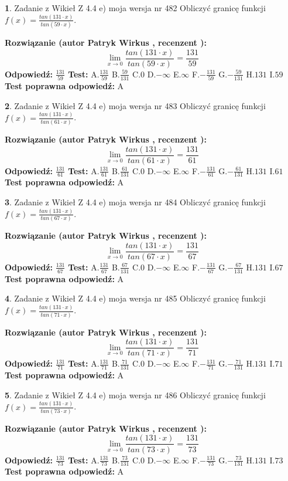 \documentclass[12pt, a4paper]{article}
\theoremstyle{definition} %
\newtheorem{zad}{}
\newcommand{\zadStart}[1]{\begin{zad}#1\newline}
\newcommand{\zadStop}{\end{zad}}
\newcommand{\rozwStart}[2]{\noindent \textbf{Rozwiązanie (autor #1 , recenzent #2): }\newline}
\newcommand{\rozwStop}{\newline}
\newcommand{\odpStart}{\noindent \textbf{Odpowiedź:}\newline}
\newcommand{\odpStop}{\newline}
\newcommand{\testStart}{\noindent \textbf{Test:}\newline}
\newcommand{\testStop}{\newline}
\newcommand{\kluczStart}{\noindent \textbf{Test poprawna odpowiedź:}\newline}
\newcommand{\kluczStop}{\newline}
\begin{document}
\zadStart{Zadanie z Wikieł Z 4.4 e) moja wersja nr 482}
Obliczyć granicę funkcji $f(x)=\frac{tan(131\cdot x)}{tan(59\cdot x)}$.
\zadStop
\rozwStart{Patryk Wirkus}{}
$$\lim\limits_{x\to 0}\frac{tan(131\cdot x)}{tan(59\cdot x)}=
\frac{131}{59}$$
\rozwStop
\odpStart
$\frac{131}{59}$
\odpStop
\testStart
A.$\frac{131}{59}$
B.$\frac{59}{131}$
C.$0$
D.$-\infty$
E.$\infty$
F.$-\frac{131}{59}$
G.$-\frac{59}{131}$
H.$131$
I.$59$
\testStop
\kluczStart
A
\kluczStop



\zadStart{Zadanie z Wikieł Z 4.4 e) moja wersja nr 483}
Obliczyć granicę funkcji $f(x)=\frac{tan(131\cdot x)}{tan(61\cdot x)}$.
\zadStop
\rozwStart{Patryk Wirkus}{}
$$\lim\limits_{x\to 0}\frac{tan(131\cdot x)}{tan(61\cdot x)}=
\frac{131}{61}$$
\rozwStop
\odpStart
$\frac{131}{61}$
\odpStop
\testStart
A.$\frac{131}{61}$
B.$\frac{61}{131}$
C.$0$
D.$-\infty$
E.$\infty$
F.$-\frac{131}{61}$
G.$-\frac{61}{131}$
H.$131$
I.$61$
\testStop
\kluczStart
A
\kluczStop



\zadStart{Zadanie z Wikieł Z 4.4 e) moja wersja nr 484}
Obliczyć granicę funkcji $f(x)=\frac{tan(131\cdot x)}{tan(67\cdot x)}$.
\zadStop
\rozwStart{Patryk Wirkus}{}
$$\lim\limits_{x\to 0}\frac{tan(131\cdot x)}{tan(67\cdot x)}=
\frac{131}{67}$$
\rozwStop
\odpStart
$\frac{131}{67}$
\odpStop
\testStart
A.$\frac{131}{67}$
B.$\frac{67}{131}$
C.$0$
D.$-\infty$
E.$\infty$
F.$-\frac{131}{67}$
G.$-\frac{67}{131}$
H.$131$
I.$67$
\testStop
\kluczStart
A
\kluczStop



\zadStart{Zadanie z Wikieł Z 4.4 e) moja wersja nr 485}
Obliczyć granicę funkcji $f(x)=\frac{tan(131\cdot x)}{tan(71\cdot x)}$.
\zadStop
\rozwStart{Patryk Wirkus}{}
$$\lim\limits_{x\to 0}\frac{tan(131\cdot x)}{tan(71\cdot x)}=
\frac{131}{71}$$
\rozwStop
\odpStart
$\frac{131}{71}$
\odpStop
\testStart
A.$\frac{131}{71}$
B.$\frac{71}{131}$
C.$0$
D.$-\infty$
E.$\infty$
F.$-\frac{131}{71}$
G.$-\frac{71}{131}$
H.$131$
I.$71$
\testStop
\kluczStart
A
\kluczStop



\zadStart{Zadanie z Wikieł Z 4.4 e) moja wersja nr 486}
Obliczyć granicę funkcji $f(x)=\frac{tan(131\cdot x)}{tan(73\cdot x)}$.
\zadStop
\rozwStart{Patryk Wirkus}{}
$$\lim\limits_{x\to 0}\frac{tan(131\cdot x)}{tan(73\cdot x)}=
\frac{131}{73}$$
\rozwStop
\odpStart
$\frac{131}{73}$
\odpStop
\testStart
A.$\frac{131}{73}$
B.$\frac{73}{131}$
C.$0$
D.$-\infty$
E.$\infty$
F.$-\frac{131}{73}$
G.$-\frac{73}{131}$
H.$131$
I.$73$
\testStop
\kluczStart
A
\kluczStop
\end{document}
